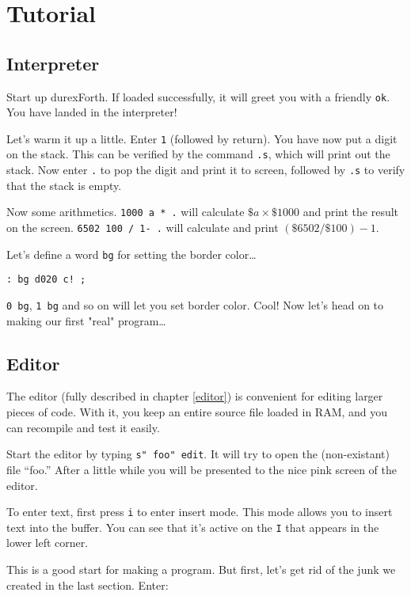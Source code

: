 \chapter{Tutorial}

\section{Interpreter}

Start up durexForth. If loaded successfully, it will greet you with a friendly \texttt{ok}. You have landed in the interpreter!

Let's warm it up a little. Enter \texttt{1} (followed by return). You have now put a digit on the stack. This can be verified by the command \texttt{.s}, which will print out the stack. Now enter \texttt{.} to pop the digit and print it to screen, followed by \texttt{.s} to verify that the stack is empty.

Now some arithmetics. \texttt{1000 a * .} will calculate $\$a \times \$1000$ and print the result on the screen. \texttt{6502 100 / 1- .} will calculate and print $(\$6502 / \$100) - 1$.

Let's define a word \texttt{bg} for setting the border color\ldots 

\begin{verbatim}
: bg d020 c! ;
\end{verbatim}

\texttt{0 bg}, \texttt{1 bg} and so on will let you set border color. Cool! Now let's head on to making our first "real" program\ldots

\section{Editor}

The editor (fully described in chapter \ref{editor}) is convenient for editing larger pieces of code. With it, you keep an entire source file loaded in RAM, and you can recompile and test it easily.

Start the editor by typing \texttt{s" foo" edit}. It will try to open the (non-existant) file ``foo.'' After a little while you will be presented to the nice pink screen of the editor.

To enter text, first press \texttt{i} to enter insert mode. This mode allows you to insert text into the buffer. You can see that it's active on the \texttt{I} that appears in the lower left corner.

This is a good start for making a program. But first, let's get rid of the junk we created in the last section. Enter:


